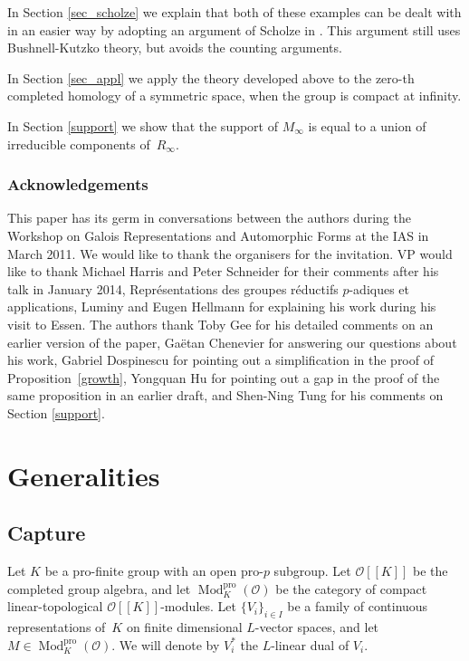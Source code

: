 \documentclass[JEP,XML,SOM,Unicode,NoEqCountersInSection]{cedram}
\let\mathcal\mathscr
\theoremstyle{definition}
\DeclareMathOperator{\Mod}{Mod}
\newcommand{\br}[1]{[\![#1]\!]}
\newcommand{\cO}{\mathcal{O}}
\newcommand{\pro}{\mathrm{pro}}
\begin{document}
In Section \ref{sec_scholze} we explain that both of these examples can be dealt with in an easier way
by adopting an argument of Scholze in \cite{scholze}. This argument still uses Bushnell-Kutzko theory, but avoids the counting arguments.

In Section \ref{sec_appl} we apply the theory developed above to the zero-th completed homology of a symmetric space, when the group is compact at infinity.

In Section \ref{support} we show that the support of $M_{\infty}$ is equal to a union of irreducible components of~$R_\infty$.

\subsubsection*{Acknowledgements} This paper has its germ in conversations between the authors during the Workshop on Galois Representations and Automorphic Forms at the IAS in March 2011.
We would like to thank the organisers for the invitation. VP would like to thank Michael Harris and Peter Schneider for their
comments after his talk in January 2014, Représentations des groupes réductifs $p$-adiques et applications, Luminy and Eugen Hellmann for explaining his work during his visit to Essen. The authors thank Toby Gee for his detailed comments on an earlier version of the paper, Gaëtan Chenevier for answering our questions about his work,
Gabriel Dospinescu for pointing out a simplification in the proof of Proposition~\ref{growth},
Yongquan Hu for pointing out a gap in the proof of the same proposition
in an earlier draft,
and Shen-Ning Tung for his comments on Section \ref{support}.

\section{Generalities}\label{generalities}

\subsection{Capture}\label{sec_capture}
Let $K$ be a pro-finite group with an open pro-$p$ subgroup.
Let $\cO\br{K}$ be the completed group algebra, and
let $\Mod^{\pro}_K(\cO)$ be the category of compact linear-topological $\cO\br{K}$-modules. Let $\{V_i\}_{i\in I}$ be a family of
continuous representations
of~$K$ on finite dimensional $L$-vector spaces, and let $M\in \Mod^{\mathrm{pro}}_K(\cO)$. We will denote by $V_i^*$ the $L$-linear dual of $V_i$.
\end{document}
